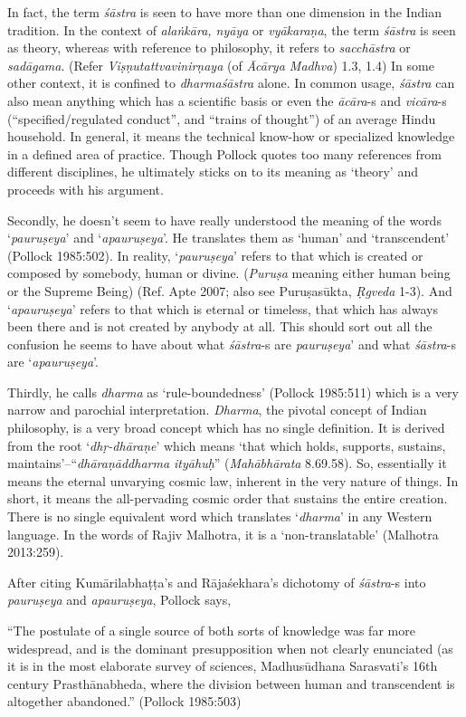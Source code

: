 In fact, the term {\it śāstra} is seen to have more than one dimension in the Indian tradition. In the context of {\it alaṅkāra, nyāya} or {\it vyākaraṇa}, the term {\it śāstra} is seen as theory, whereas with reference to philosophy, it refers to {\it sacchāstra} or {\it sadāgama}. (Refer {\it Viṣṇutattvavinirṇaya} (of {\it Ācārya Madhva}) 1.3, 1.4)  In some other context, it is confined to {\it dharmaśāstra} alone. In common usage, {\it śāstra} can also mean anything which has a scientific basis or even the {\it ācāra}-s and {\it vicāra}-s (``specified/regulated conduct'', and ``trains of thought'') of an average Hindu household. In general, it means the technical know-how or specialized knowledge in a defined area of practice. Though Pollock quotes too many references from different disciplines, he ultimately sticks on to its meaning as `theory' and proceeds with his argument. 

Secondly, he doesn't seem to have really understood the meaning of the words `{\it pauruṣeya}' and `{\it apauruṣeya}'. He translates them as `human' and `transcendent' (Pollock 1985:502). In reality, `{\it pauruṣeya}' refers to that which is created or composed by somebody, human or divine. ({\it Puruṣa} meaning either human being or the Supreme Being) (Ref. Apte 2007; also see Puruṣasūkta, {\it Ṛgveda} 1-3). And `{\it apauruṣeya}' refers to that which is eternal or timeless, that which has always been there and is not created by anybody at all. This should sort out all the confusion he seems to have about what {\it śāstra}-s are {\it pauruṣeya}' and what {\it śāstra}-s are `{\it apauruṣeya}'. 

Thirdly, he calls {\it dharma} as `rule-boundedness' (Pollock 1985:511) which is a very narrow and parochial interpretation. {\it Dharma}, the pivotal concept of Indian philosophy, is a very broad concept which has no single definition. It is derived from the root `\textit{dhṛ-dhāraṇe}' which means `that which holds, supports, sustains, maintains'--``\textit{dhāraṇāddharma ityāhuḥ}'' ({\it Mahābhārata} 8.69.58). So, essentially it means the eternal unvarying cosmic law, inherent in the very nature of things. In short, it means the all-pervading cosmic order that sustains the entire creation. There is no single equivalent word which translates `{\it dharma}' in any Western language. In the words of Rajiv Malhotra, it is a `non-translatable' (Malhotra 2013:259).

After citing Kumārilabhaṭṭa's and Rājaśekhara's dichotomy of {\it śāstra}-s into {\it pauruṣeya} and {\it apauruṣeya}, Pollock says,
\begin{myquote}
``The postulate of a single source of both sorts of knowledge was far more widespread, and is the dominant presupposition when not clearly enunciated (as it is in the most elaborate survey of sciences, Madhusūdhana Sarasvati's 16th century Prasthānabheda, where the division between human and transcendent is altogether abandoned.'' (Pollock 1985:503)
\end{myquote}

